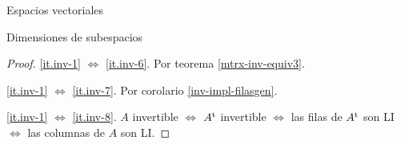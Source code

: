\begin{chapter}{Espacios vectoriales}
\begin{section}{Dimensiones de subespacios}
\begin{proof}
    \ref{it.inv-1} $\Leftrightarrow$ \ref{it.inv-6}. Por teorema \ref{mtrx-inv-equiv3}.
    
    \ref{it.inv-1} $\Leftrightarrow$ \ref{it.inv-7}. Por corolario \ref{inv-impl-filasgen}.
    
    \ref{it.inv-1} $\Leftrightarrow$ \ref{it.inv-8}. $A$ invertible $\Leftrightarrow$ $A^{\operatorname{t}}$ invertible $\Leftrightarrow$  las filas de $A^{\operatorname{t}}$ son LI $\Leftrightarrow$  las columnas de $A$ son LI. 
\end{proof}
    
    \end{section}



    \end{chapter}